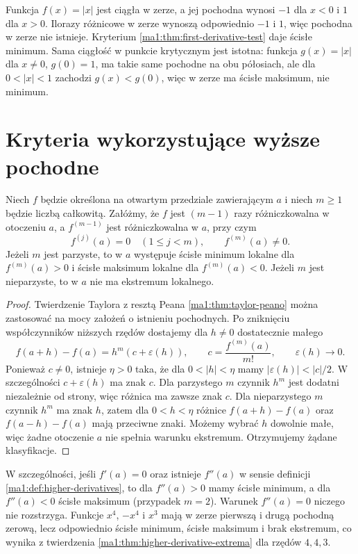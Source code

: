 \begin{przyklad}
\label{ma1:ex:critical-nondifferentiable}
Funkcja $f(x)=|x|$ jest ciągła w zerze, a jej pochodna wynosi $-1$ dla $x<0$ i $1$ dla $x>0$. Ilorazy różnicowe w zerze wynoszą odpowiednio $-1$ i $1$, więc pochodna w zerze nie istnieje. Kryterium \ref{ma1:thm:first-derivative-test} daje ścisłe minimum. Sama ciągłość w punkcie krytycznym jest istotna: funkcja $g(x)=|x|$ dla $x\ne0$, $g(0)=1$, ma takie same pochodne na obu półosiach, ale dla $0<|x|<1$ zachodzi $g(x)<g(0)$, więc w zerze ma ścisłe maksimum, nie minimum.
\end{przyklad}

\section{Kryteria wykorzystujące wyższe pochodne}
\begin{twierdzenie}
\label{ma1:thm:higher-derivative-extrema}
Niech $f$ będzie określona na otwartym przedziale zawierającym $a$ i niech $m\ge1$ będzie liczbą całkowitą. Załóżmy, że $f$ jest $(m-1)$ razy różniczkowalna w otoczeniu $a$, a $f^{(m-1)}$ jest różniczkowalna w $a$, przy czym
\[
 f^{(j)}(a)=0\quad(1\le j<m),\qquad f^{(m)}(a)\ne0.
\]
Jeżeli $m$ jest parzyste, to w $a$ występuje ścisłe minimum lokalne dla $f^{(m)}(a)>0$ i ścisłe maksimum lokalne dla $f^{(m)}(a)<0$. Jeżeli $m$ jest nieparzyste, to w $a$ nie ma ekstremum lokalnego.
\end{twierdzenie}
\begin{proof}
Twierdzenie Taylora z resztą Peana \ref{ma1:thm:taylor-peano} można zastosować na mocy założeń o istnieniu pochodnych. Po zniknięciu współczynników niższych rzędów dostajemy dla $h\ne0$ dostatecznie małego
\[
 f(a+h)-f(a)=h^m(c+\varepsilon(h)),\qquad
 c=\frac{f^{(m)}(a)}{m!},\qquad \varepsilon(h)\longrightarrow0.
\]
Ponieważ $c\ne0$, istnieje $\eta>0$ taka, że dla $0<|h|<\eta$ mamy $|\varepsilon(h)|<|c|/2$. W szczególności $c+\varepsilon(h)$ ma znak $c$. Dla parzystego $m$ czynnik $h^m$ jest dodatni niezależnie od strony, więc różnica ma zawsze znak $c$. Dla nieparzystego $m$ czynnik $h^m$ ma znak $h$, zatem dla $0<h<\eta$ różnice $f(a+h)-f(a)$ oraz $f(a-h)-f(a)$ mają przeciwne znaki. Możemy wybrać $h$ dowolnie małe, więc żadne otoczenie $a$ nie spełnia warunku ekstremum. Otrzymujemy żądane klasyfikacje.
\end{proof}
W szczególności, jeśli $f'(a)=0$ oraz istnieje $f''(a)$ w sensie definicji \ref{ma1:def:higher-derivatives}, to dla $f''(a)>0$ mamy ścisłe minimum, a dla $f''(a)<0$ ścisłe maksimum (przypadek $m=2$). Warunek $f''(a)=0$ niczego nie rozstrzyga. Funkcje $x^4$, $-x^4$ i $x^3$ mają w zerze pierwszą i drugą pochodną zerową, lecz odpowiednio ścisłe minimum, ścisłe maksimum i brak ekstremum, co wynika z twierdzenia \ref{ma1:thm:higher-derivative-extrema} dla rzędów $4,4,3$.

